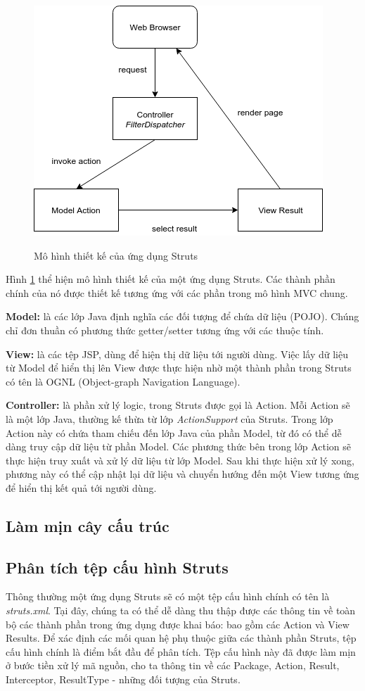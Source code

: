 \documentclass[12pt]{report}
\begin{document}
\begin{figure}[h]
	\centering
	\includegraphics[scale=0.8]{struts-architecture}
	\label{fig:struts-architecture}
	\caption{Mô hình thiết kế của ứng dụng Struts}
\end{figure}

Hình \ref{fig:struts-architecture} thể hiện mô hình thiết kế của một ứng dụng Struts. Các thành phần chính của nó được thiết kế tương ứng với các phần trong mô hình MVC chung.

\textbf{Model:} là các lớp Java định nghĩa các đối tượng để chứa dữ liệu (POJO). Chúng chỉ đơn thuần có phương thức getter/setter tương ứng với các thuộc tính.

\textbf{View:} là các tệp JSP, dùng để hiện thị dữ liệu tới người dùng. Việc lấy dữ liệu từ Model để hiển thị lên View được thực hiện nhờ một thành phần trong Struts có tên là OGNL (Object-graph Navigation Language).

\textbf{Controller:} là phần xử lý logic, trong Struts được gọi là Action. Mỗi Action sẽ là một lớp Java, thường kế thừa từ lớp \textit{ActionSupport} của Struts. Trong lớp Action này có chứa tham chiếu đến lớp Java của phần Model, từ đó có thể dễ dàng truy cập dữ liệu từ phần Model. Các phương thức bên trong lớp Action sẽ thực hiện truy xuất và xử lý dữ liệu từ lớp Model. Sau khi thực hiện xử lý xong, phương này có thể cập nhật lại dữ liệu và chuyển hướng đến một View tương ứng để hiển thị kết quả tới người dùng.

\subsection{Làm mịn cây cấu trúc}

\subsection{Phân tích tệp cấu hình Struts}
Thông thường một ứng dụng Struts sẽ có một tệp cấu hình chính có tên là \textit{struts.xml}. Tại đây, chúng ta có thể dễ dàng thu thập được các thông tin về toàn bộ các thành phần trong ứng dụng được khai báo: bao gồm các Action và View Results. Để xác định các mối quan hệ phụ thuộc giữa các thành phần Struts, tệp cấu hình chính là điểm bắt đầu để phân tích. Tệp cấu hình này đã được làm mịn ở bước tiền xử lý mã nguồn, cho ta thông tin về các Package, Action, Result, Interceptor, ResultType - những đối tượng của Struts.
\end{document}
